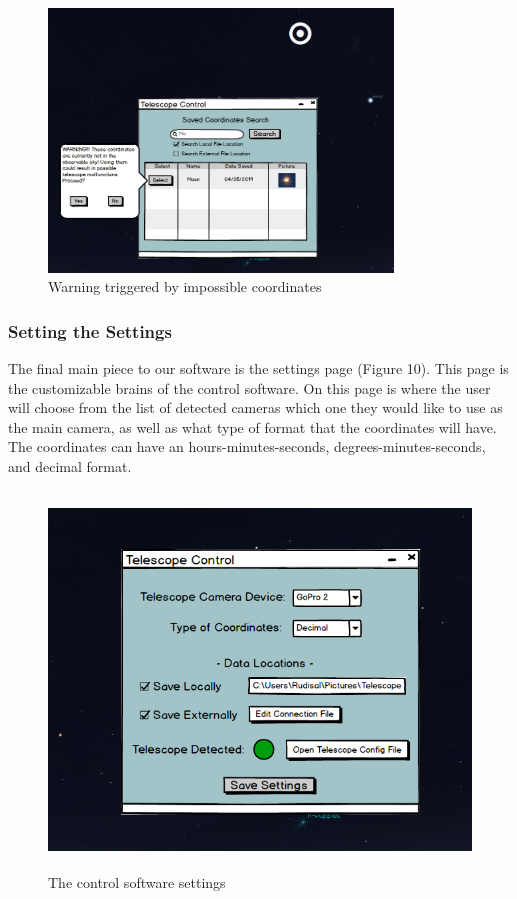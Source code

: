 \documentclass[12pt]{report}
\begin{document}
\begin{figure}[h]
	\centering
	\includegraphics[width=0.65\linewidth, height=7.0cm]{SearchwithWarning}
	\caption{Warning triggered by impossible coordinates}
\end{figure}

\newpage

\subsubsection*{Setting the Settings}

The final main piece to our software is the settings page (Figure 10). This page is the customizable brains of the control software. On this page is where the user will choose from the list of detected cameras which one they would like to use as the main camera, as well as what type of format that the coordinates will have. The coordinates can have an hours-minutes-seconds, degrees-minutes-seconds, and decimal format.

\begin{figure}[h]
	\centering
	\includegraphics[width=0.75\linewidth, height=10.0cm]{Settings}
	\caption{The control software settings}
\end{figure}
\end{document}
